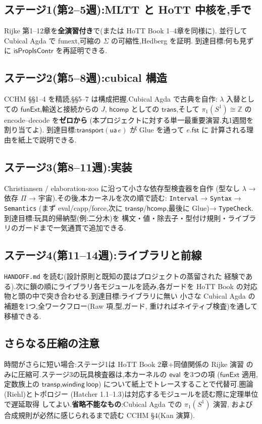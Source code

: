 \documentclass[11pt]{ltjsarticle}
\newcommand{\op}[1]{\ensuremath{\mathsf{#1}}}
\newcommand{\Z}{\mathbb{Z}}
\begin{document}
\subsection*{ステージ1(第2--5週):MLTT と HoTT 中核を,手で}
Rijke 第1--12章を\textbf{全演習付き}で(または HoTT Book 1--4章を同様に).
並行して Cubical Agda で funext,可縮の $\Sigma$ の可縮性,Hedberg を証明.
到達目標:何も見ずに $\op{isPropIsContr}$ を再証明できる.

\subsection*{ステージ2(第5--8週):cubical 構造}
CCHM \S\S1--4 を精読,\S\S5--7 は構成把握.Cubical Agda で古典を自作:
$\lambda$ 入替としての $\op{funExt}$,輸送と接続からの $J$,
$\op{hcomp}$ としての $\op{trans}$,そして
$\pi_1(S^1)\cong\Z$ の encode--decode を\textbf{ゼロから}
(本プロジェクトに対する単一最重要演習.丸1週間を割り当てよ).
到達目標:$\op{transport}(\op{ua}\,e)$ が Glue を通って $e.\op{fst}$ に
計算される理由を紙上で説明できる.

\subsection*{ステージ3(第8--11週):実装}
Christiansen / elaboration-zoo に沿って小さな依存型検査器を自作
(型なし $\lambda$ → 依存 $\Pi$ → 宇宙).その後,本カーネルを次の順で読む:
\texttt{Interval} → \texttt{Syntax} → \texttt{Semantics}
(まず eval/capp/force,次に \op{transp}/\op{hcomp},最後に Glue)→
\texttt{TypeCheck}.到達目標:玩具的帰納型(例:二分木)を
構文・値・除去子・型付け規則・ライブラリのガードまで一気通貫で追加できる.

\subsection*{ステージ4(第11--14週):ライブラリと前線}
\texttt{HANDOFF.md} を読む(設計原則と既知の罠はプロジェクトの蒸留された
経験である).次に鎖の順にライブラリ各モジュールを読み,各ガードを
HoTT Book の対応物と頭の中で突き合わせる.到達目標:ライブラリに無い
小さな Cubical Agda の補題を1つ,全ワークフロー(Raw 項,型,ガード,
重ければネイティブ検査)を通して移植できる.

\subsection*{さらなる圧縮の注意}
時間がさらに短い場合:ステージ1は HoTT Book 2章+同値関係の Rijke 演習
のみに圧縮可.ステージ3の玩具検査器は,本カーネルの \op{eval} を3つの項
($\op{funExt}$ 適用,定数族上の $\op{transp}$,$\op{winding}\,\op{loop}$)
について紙上でトレースすることで代替可.圏論(Riehl)とトポロジー
(Hatcher 1.1--1.3)は対応するモジュールを読む際に定理単位で遅延取得
してよい.\textbf{省略不能なもの}:Cubical Agda での $\pi_1(S^1)$ 演習,
および合成規則が必然に感じられるまで読む CCHM \S4(Kan 演算).
\end{document}
